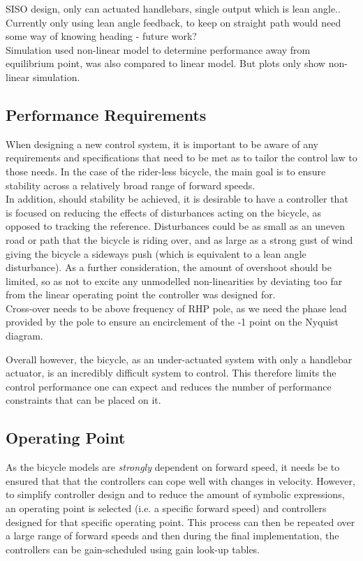 SISO design, only can actuated handlebars, single output which is lean angle..
Currently only using lean angle feedback, to keep on straight path would need some way of knowing heading - future work? \\
Simulation used non-linear model to determine performance away from equilibrium point, was also compared to linear model. But plots only show non-linear simulation.

\subsection{Performance Requirements}
When designing a new control system, it is important to be aware of any requirements and specifications that need to be met as to tailor the control law to those needs. In the case of the rider-less bicycle, the main goal is to ensure stability across a relatively broad range of forward speeds.\\

In addition, should stability be achieved, it is desirable to have a controller that is focused on reducing the effects of disturbances acting on the bicycle, as opposed to tracking the reference. Disturbances could be as small as an uneven road or path that the bicycle is riding over, and as large as a strong gust of wind giving the bicycle a sideways push (which is equivalent to a lean angle disturbance). As a further consideration, the amount of overshoot should be limited, so as not to excite any unmodelled non-linearities by deviating too far from the linear operating point the controller was designed for. \\


Cross-over needs to be above frequency of RHP pole, as we need the phase lead provided by the pole to ensure an encirclement of the -1 point on the Nyquist diagram.

Overall however, the bicycle, as an under-actuated system with only a handlebar actuator, is an incredibly difficult system to control. This therefore limits the control performance one can expect and reduces the number of performance constraints that can be placed on it.

\subsection{Operating Point}
As the bicycle models are \textit{strongly} dependent on forward speed, it needs be to ensured that that the controllers can cope well with changes in velocity. However, to simplify controller design and to reduce the amount of symbolic expressions, an operating point is selected (i.e. a specific forward speed) and controllers designed for that specific operating point. This process can then be repeated over a large range of forward speeds and then during the final implementation, the controllers can be gain-scheduled using gain look-up tables. \\

